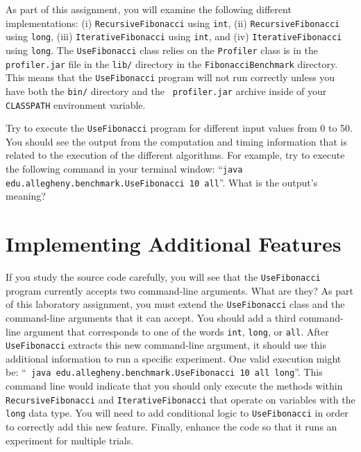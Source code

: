 \begin{sloppypar}

  As part of this assignment, you will examine the following different implementations: (i) {\tt RecursiveFibonacci}
  using {\tt int}, (ii) {\tt RecursiveFibonacci} using {\tt long}, (iii) {\tt IterativeFibonacci} using {\tt int}, and
  (iv) {\tt IterativeFibonacci} using {\tt long}. The {\tt UseFibonacci} class relies on the {\tt Profiler} class is in
  the {\tt profiler.jar} file in the {\tt lib/} directory in the {\tt FibonacciBenchmark} directory.  This means that
  the {\tt UseFibonacci} program will not run correctly unless you have both the {\tt bin/} directory and the {\tt
  profiler.jar} archive inside of your {\tt CLASSPATH} environment variable.

\end{sloppypar}

Try to execute the {\tt UseFibonacci} program for different input values from 0 to 50. You should see the output
from the computation and timing information that is related to the execution of the different algorithms. For example,
try to execute the following command in your terminal window: ``{\tt java edu.allegheny.benchmark.UseFibonacci 10
all}''. What is the output's meaning?

\section*{Implementing Additional Features}

If you study the source code carefully, you will see that the {\tt UseFibonacci} program currently accepts two
command-line arguments. What are they? As part of this laboratory assignment, you must extend the {\tt UseFibonacci}
class and the command-line arguments that it can accept. You should add a third command-line argument that corresponds
to one of the words {\tt int}, {\tt long}, or {\tt all}. After {\tt UseFibonacci} extracts this new command-line
argument, it should use this additional information to run a specific experiment. One valid execution might be: ``{\tt
java edu.allegheny.benchmark.Use\-Fibonacci 10 all long}''. This command line would indicate that you should only
execute the methods within {\tt RecursiveFibonacci} and {\tt IterativeFibonacci} that operate on variables with the
{\tt long} data type. You will need to add conditional logic to {\tt UseFibonacci} in order to correctly add this new
feature. Finally, enhance the code so that it runs an experiment for multiple trials.

